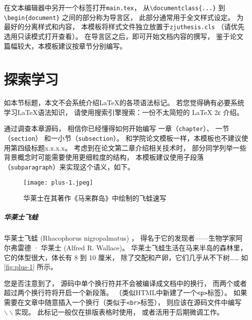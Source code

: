 在文本编辑器中另开一个标签打开\texttt{main.tex}，
从\texttt{\textbackslash documentclass\{...\}}
到\\\texttt{\textbackslash begin\{document\}}
之间的部分称为导言区，
此部分通常用于全文样式设定。
为最好的分离样式和内容，
本模板将样式文件独立放置于\texttt{zjuthesis.cls}
（请优先选用只读模式打开查看）。
在导言区之后，即可开始文档内容的撰写，
鉴于论文篇幅较大，本模板建议按章节分别编写。

\section{探索学习}
如本节标题，本文不会系统介绍\LaTeX 的各项语法标记。
若您觉得确有必要系统学习\LaTeX 语法知识，
请使用搜索引擎搜索：一份不太简短的 LaTeX 2ε 介绍。

通过调查本章源码，
相信你已经懂得如何开始编写
一章（\texttt{chapter}）、
一节（\texttt{section}）
和一小节（\texttt{subsection}）。
和学院论文模板一样，本模板也不建议使用第四级标题x.x.x.x。
考虑到在论文第二章介绍相关技术时，
部分同学列举一些背景概念时可能需要使用更细粒度的结构，
本模板建议使用子段落（\texttt{subparagraph}）来实现这个语义，如下。

\begin{figure}[htbp]
    \centering  %
    \texttt{[image: plus-1.jpeg]} %
    \caption{华莱士在其著作《马来群岛》中绘制的飞蛙速写} %
    \label{fig:plus-1} %
\end{figure}


\subparagraph{华莱士飞蛙} %
华莱士飞蛙 (Rhacophorus nigropalmatus) ，
得名于它的发现者——生物学家阿尔弗雷德 · 华莱士 (Alfred R. Wallace)。
华莱士飞蛙生活在马来半岛的森林里，
它的体型很大，体长有 8 到 10 厘米，
除了交配和产卵，它们几乎从不下树……
如\autoref{fig:plus-1} 所示。

您是否注意到了，
源码中单个换行符并不会被编译成文档中的换行，
而两个或者超过两个换行符将开启一个新段落。
（类似HTML中新建了一个\texttt{<p>}标签）。
如果需要在文章中随意插入一个换行（类似于\texttt{<br>}标签），
则应该在源码文件中编写$\backslash\backslash$实现。
此标记一般仅在排版表格时使用，
或者活用于后期微调工作。

